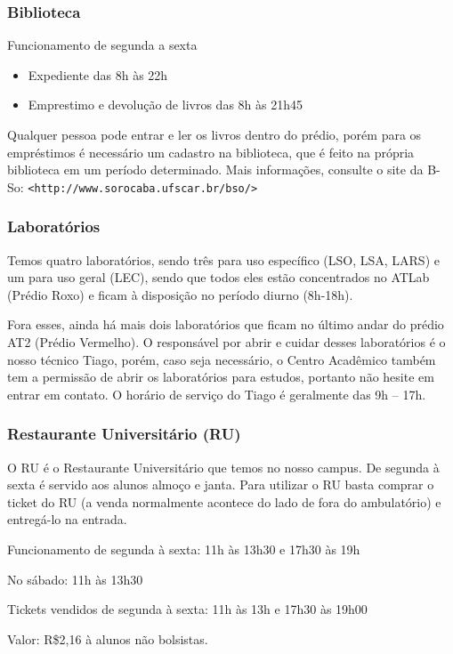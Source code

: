 \subsubsection{Biblioteca}
\noindent Funcionamento de segunda a sexta
\begin{itemize}
  \item Expediente das 8h às 22h
  \item Emprestimo e devolução de livros das 8h às 21h45
\end{itemize}
\noindent Qualquer pessoa pode entrar e ler os livros dentro do prédio, porém para os empréstimos é necessário um cadastro na biblioteca, que é feito na própria biblioteca em um período determinado.
\newline \newline Mais informações, consulte o site da B-So:
\texttt{<http://www.sorocaba.ufscar.br/bso/>}

\subsubsection{Laboratórios}
Temos quatro laboratórios, sendo três para uso específico (LSO, LSA, LARS) e um para uso geral (LEC), sendo que todos eles estão
concentrados no ATLab (Prédio Roxo) e ficam à disposição no período diurno (8h-18h).

Fora esses, ainda há mais dois laboratórios que ficam no último andar do prédio AT2 (Prédio Vermelho).
O responsável por abrir e cuidar desses laboratórios é o nosso técnico Tiago,
porém, caso seja necessário, o Centro Acadêmico também tem a permissão de
abrir os laboratórios para estudos, portanto não hesite em entrar em contato.
O horário de serviço do Tiago é geralmente das 9h -- 17h.

\subsubsection{Restaurante Universitário (RU)}
O RU é o Restaurante Universitário que temos no nosso campus. De segunda à sexta é servido aos alunos almoço e janta. Para utilizar o RU basta comprar o ticket do RU (a venda normalmente acontece do lado de fora do ambulatório) e entregá-lo na entrada.

Funcionamento de segunda à sexta: 11h às 13h30 e 17h30 às 19h

No sábado: 11h às 13h30

Tickets vendidos de segunda à sexta: 11h às 13h e 17h30 às 19h00

Valor: R\$2,16 à alunos não bolsistas.

